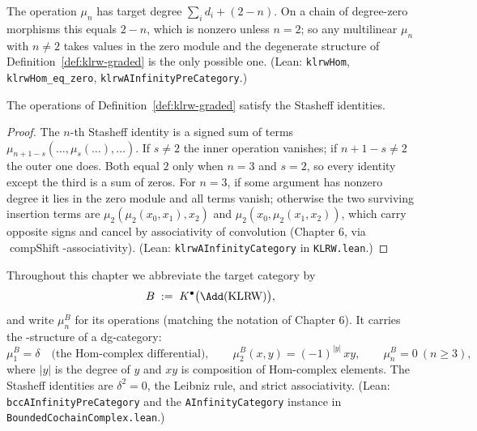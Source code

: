 \begin{remark}
  The operation $\mu_n$ has target degree $\sum_i d_i + (2-n)$. On a chain of
  degree-zero morphisms this equals $2-n$, which is nonzero unless $n = 2$; so
  any multilinear $\mu_n$ with $n \neq 2$ takes values in the zero module and
  the degenerate structure of Definition~\ref{def:klrw-graded} is the only
  possible one. (Lean: \texttt{klrwHom}, \texttt{klrwHom\_eq\_zero},
  \texttt{klrwAInfinityPreCategory}.)
\end{remark}

\begin{theorem}\label{thm:klrw-ainf}
  The operations of Definition~\ref{def:klrw-graded} satisfy the Stasheff
  identities.
\end{theorem}

\begin{proof}
  The $n$-th Stasheff identity is a signed sum of terms
  $\mu_{n+1-s}(\dots, \mu_s(\dots), \dots)$. If $s \neq 2$ the inner operation
  vanishes; if $n + 1 - s \neq 2$ the outer one does. Both equal $2$ only when
  $n = 3$ and $s = 2$, so every identity except the third is a sum of zeros.
  For $n = 3$, if some argument has nonzero degree it lies in the zero module
  and all terms vanish; otherwise the two surviving insertion terms are
  $\mu_2(\mu_2(x_0,x_1),x_2)$ and $\mu_2(x_0,\mu_2(x_1,x_2))$, which carry
  opposite signs and cancel by associativity of convolution
  (Chapter 6, via $\operatorname{compShift}$-associativity). (Lean:
  \texttt{klrwAInfinityCategory} in \texttt{KLRW.lean}.)
\end{proof}

\begin{definition}\label{def:dg-target}
  Throughout this chapter we abbreviate the target category by
  \[
    B \;:=\; K^\bullet\big(\Add(\KLRW)\big),
  \]
  and write $\mu^B_n$ for its operations (matching the notation of
  Chapter 6). It carries the \Ainf-structure of a dg-category:
  \[
    \mu^B_1 = \delta \quad\text{(the Hom-complex differential)}, \qquad
    \mu^B_2(x, y) = (-1)^{|y|}\, x y, \qquad
    \mu^B_n = 0 \ (n \geq 3),
  \]
  where $|y|$ is the degree of $y$ and $xy$ is composition of Hom-complex
  elements. The Stasheff identities are $\delta^2 = 0$, the Leibniz rule, and
  strict associativity. (Lean: \texttt{bccAInfinityPreCategory} and the
  \texttt{AInfinityCategory} instance in \texttt{BoundedCochainComplex.lean}.)
\end{definition}

